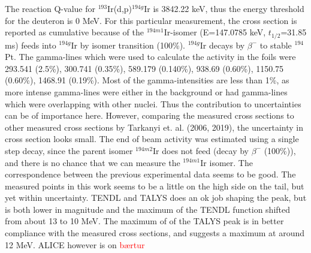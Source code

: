\documentclass[a4paper,11pt,twoside]{book}
\begin{document}
\subsubsection{}
The reaction Q-value for $^{193}$Ir(d,p)$^{194g}$Ir is 3842.22 keV, thus the energy threshold for the deuteron is 0 MeV. For this particular measurement, the cross section is reported as cumulative because of the $^{194m1}$Ir-isomer (E=147.0785 keV, $t_{1/2}$=31.85 ms) feeds into $^{194g}$Ir by isomer transition (100\%). $^{194g}$Ir decays by $\beta^-$ to stable $^{194}$Pt. The gamma-lines which were used to calculate the activity in the foils were 293.541 (2.5\%), 300.741 (0.35\%), 589.179 (0.140\%), 938.69 (0.60\%), 1150.75 (0.60\%), 1468.91 (0.19\%). Most of the gamma-intensities are less than 1\%, as more intense gamma-lines were either in the background or had gamma-lines which were overlapping with other nuclei. Thus the contribution to uncertainties can be of importance here. However, comparing the measured cross sections to other measured cross sections by Tarkanyi et. al. (2006, 2019), the uncertainty in cross section looks small. The end of beam activity was estimated using a single step decay, since the parent isomer $^{194m2}$Ir does not feed (decay by $\beta^-$ (100\%)), and there is no chance that we can measure the $^{194m1}$Ir isomer. The correspondence between the previous experimental data seems to be good. The measured points in this work seems to be a little on the high side on the tail, but yet within uncertainty. TENDL and TALYS does an ok job shaping the peak, but is both lower in magnitude and the maximum of the TENDL function shifted from about 13 to 10 MeV. The maximum of of the TALYS peak is in better compliance with the measured cross sections, and suggests a maximum at around 12 MeV. ALICE however is on \textcolor{red}{bærtur}
\end{document}

